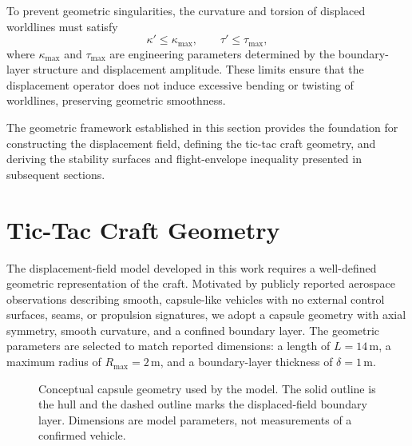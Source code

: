 \documentclass[aip,adv,reprint,floatfix]{revtex4-2}
\begin{document}
To prevent geometric singularities, the curvature and torsion of displaced worldlines must satisfy
\begin{equation}
\kappa' \leq \kappa_{\max},
\qquad
\tau' \leq \tau_{\max},
\end{equation}
where $\kappa_{\max}$ and $\tau_{\max}$ are engineering parameters determined by the boundary-layer structure and displacement amplitude. These limits ensure that the displacement operator does not induce excessive bending or twisting of worldlines, preserving geometric smoothness.

The geometric framework established in this section provides the foundation for constructing the displacement field, defining the tic-tac craft geometry, and deriving the stability surfaces and flight-envelope inequality presented in subsequent sections.
\section{Tic-Tac Craft Geometry}

The displacement-field model developed in this work requires a well-defined geometric representation of the craft. Motivated by publicly reported aerospace observations describing smooth, capsule-like vehicles with no external control surfaces, seams, or propulsion signatures, we adopt a capsule geometry with axial symmetry, smooth curvature, and a confined boundary layer. The geometric parameters are selected to match reported dimensions: a length of $L = 14\,\mathrm{m}$, a maximum radius of $R_{\max} = 2\,\mathrm{m}$, and a boundary-layer thickness of $\delta = 1\,\mathrm{m}$.

\begin{figure}[tb]
\centering
{}
\caption{Conceptual capsule geometry used by the model. The solid outline is the hull and the dashed outline marks the displaced-field boundary layer. Dimensions are model parameters, not measurements of a confirmed vehicle.}
\label{fig:capsule_geometry}
\end{figure}
\end{document}
